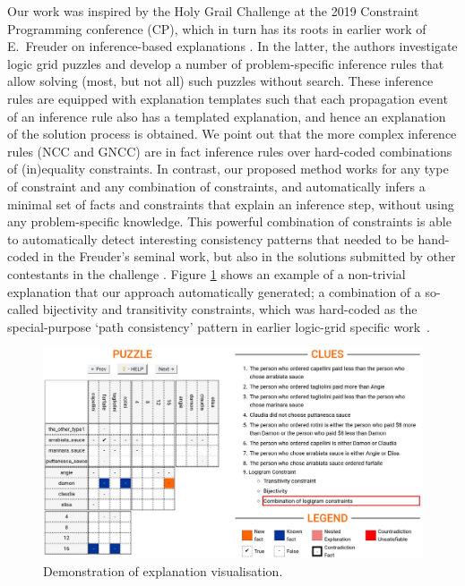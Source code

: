 Our work was inspired by the Holy Grail Challenge \cite{freuder2018progress} at the 2019 Constraint Programming conference (CP), which in turn has its roots in earlier work of E.~Freuder on inference-based explanations \cite{sqalli1996inference}.
In the latter, the authors investigate logic grid puzzles and develop a number of problem-specific inference rules that allow solving (most, but not all) such puzzles without search.
These inference rules are equipped with explanation templates such that each propagation event of an inference rule also has a templated explanation, and hence an explanation of the solution process is obtained.
We point out that the more complex inference rules (NCC and GNCC) are in fact inference rules over hard-coded combinations of (in)equality constraints.
In contrast, our proposed method works for any type of constraint and any combination of constraints, and automatically infers a minimal set of facts and constraints that explain an inference step, without using any problem-specific knowledge.
This powerful combination of constraints is able to automatically detect interesting consistency patterns that needed to be hand-coded in the Freuder's seminal work, but also in the solutions submitted by other
contestants in the challenge \cite{escamocher2019solving}.
Figure \ref{fig:zebrascreen:path} shows an example of a non-trivial explanation that our approach automatically generated; a combination of a so-called bijectivity and transitivity constraints, which was hard-coded as the special-purpose `path consistency' pattern in earlier logic-grid specific work~\cite{sqalli1996inference}.


\begin{figure}[ht]
    \centering
    \includegraphics[width=0.9\linewidth]{figures/related_work.jpeg}
    \caption{Demonstration of explanation visualisation.}
    \label{fig:zebrascreen:path}
\end{figure}


